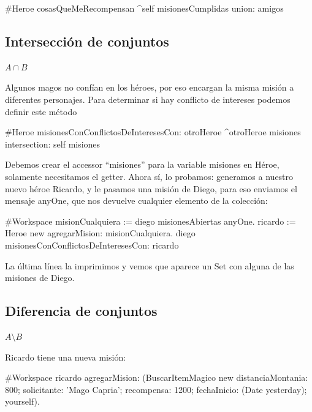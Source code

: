 \documentclass[a4paper,12pt]{book}
\begin{document}
\begin{code}
#Heroe
cosasQueMeRecompensan
    ^self misionesCumplidas union: amigos
\end{code}

\subsection{Intersección de conjuntos}

\begin{mdframed}[style=BoxFrame]
\( A \cap B \)
\end{mdframed}

Algunos magos no confían en los héroes, por eso encargan la misma misión a diferentes personajes. Para determinar
si hay conflicto de intereses podemos definir este método

\begin{code}
#Heroe
misionesConConflictosDeInteresesCon: otroHeroe
     ^otroHeroe misiones intersection: self misiones
\end{code}

Debemos crear el accessor ``misiones'' para la variable misiones en Héroe, solamente necesitamos el getter. 
Ahora sí, lo probamos: generamos a nuestro nuevo héroe Ricardo, y le pasamos una misión de Diego, 
para eso enviamos el mensaje anyOne, que nos devuelve cualquier elemento de la colección:

\begin{code}
#Workspace
 misionCualquiera := diego misionesAbiertas anyOne.
 ricardo := Heroe new agregarMision: misionCualquiera.
 diego misionesConConflictosDeInteresesCon: ricardo
\end{code}

La última línea la imprimimos y vemos que aparece un Set con alguna de las misiones de Diego.

\subsection{Diferencia de conjuntos}

\begin{mdframed}[style=BoxFrame]
\( A \setminus B \)
\end{mdframed}

Ricardo tiene una nueva misión:

\begin{code}
#Workspace
 ricardo agregarMision: (BuscarItemMagico new 
			distanciaMontania: 800;
			solicitante: 'Mago Capria';
			recompensa: 1200;
			fechaInicio: (Date yesterday);
			yourself).
\end{code}
\end{document}
